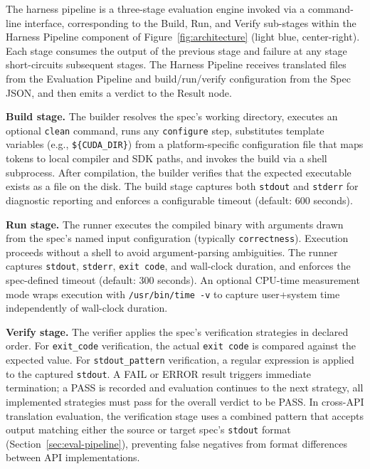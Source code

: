 The harness pipeline is a three-stage evaluation engine invoked via a command-line interface, corresponding to the Build, Run, and Verify sub-stages within the Harness Pipeline component of Figure~\ref{fig:architecture} (light blue, center-right). Each stage consumes the output of the previous stage and failure at any stage short-circuits subsequent stages. The Harness Pipeline receives translated files from the Evaluation Pipeline and build/run/verify configuration from the Spec JSON, and then emits a verdict to the Result node.

\textbf{Build stage.} The builder resolves the spec's working directory, executes an optional \texttt{clean} command, runs any \texttt{configure} step, substitutes template variables (e.g., \texttt{\$\{CUDA\_DIR\}}) from a platform-specific configuration file that maps tokens to local compiler and SDK paths, and invokes the build via a shell subprocess. After compilation, the builder verifies that the expected executable exists as a file on the disk. The build stage captures both \texttt{stdout} and \texttt{stderr} for diagnostic reporting and enforces a configurable timeout (default: 600 seconds).

\textbf{Run stage.} The runner executes the compiled binary with arguments drawn from the spec's named input configuration (typically \texttt{correctness}). Execution proceeds without a shell to avoid argument-parsing ambiguities. The runner captures \texttt{stdout}, \texttt{stderr}, \texttt{exit code}, and wall-clock duration, and enforces the spec-defined timeout (default: 300 seconds). An optional CPU-time measurement mode wraps execution with \texttt{/usr/bin/time -v} to capture user+system time independently of wall-clock duration.

\textbf{Verify stage.} The verifier applies the spec's verification strategies in declared order. For \texttt{exit\_code} verification, the actual \texttt{exit code} is compared against the expected value. For \texttt{stdout\_pattern} verification, a regular expression is applied to the captured \texttt{stdout}. A FAIL or ERROR result triggers immediate termination; a PASS is recorded and evaluation continues to the next strategy, all implemented strategies must pass for the overall verdict to be PASS. In cross-API translation evaluation, the verification stage uses a combined pattern that accepts output matching either the source or target spec's \texttt{stdout} format (Section~\ref{sec:eval-pipeline}), preventing false negatives from format differences between API implementations. 

